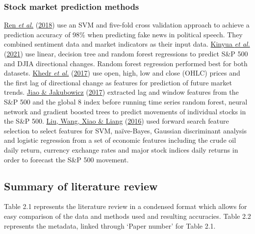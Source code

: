 \documentclass[11pt,preprint, authoryear]{elsarticle}
\numberwithin{equation}{section}
\numberwithin{figure}{section}
\numberwithin{table}{section}
\begin{document}
\hypertarget{stock-market-prediction-methods}{%
\subsubsection{\texorpdfstring{Stock market prediction methods
\label{stockPred}}{Stock market prediction methods }}\label{stock-market-prediction-methods}}

\protect\hyperlink{ref-ren2018forecasting}{Ren \emph{et al.}}
(\protect\hyperlink{ref-ren2018forecasting}{2018}) use an SVM and
five-fold cross validation approach to achieve a prediction accuracy of
98\% when predicting fake news in political speech. They combined
sentiment data and market indicators as their input data.
\protect\hyperlink{ref-kinyua2021analysis}{Kinyua \emph{et al.}}
(\protect\hyperlink{ref-kinyua2021analysis}{2021}) use linear, decision
tree and random forest regressions to predict S\&P 500 and DJIA
directional changes. Random forest regression performed best for both
datasets. \protect\hyperlink{ref-khedr2017predicting}{Khedr \emph{et
al.}} (\protect\hyperlink{ref-khedr2017predicting}{2017}) use open,
high, low and close (OHLC) prices and the first lag of directional
change as features for prediction of future market trends.
\protect\hyperlink{ref-jiao2017predicting}{Jiao \& Jakubowicz}
(\protect\hyperlink{ref-jiao2017predicting}{2017}) extracted lag and
window features from the S\&P 500 and the global 8 index before running
time series random forest, neural network and gradient boosted trees to
predict movements of individual stocks in the S\&P 500.
\protect\hyperlink{ref-liu2016forecasting}{Liu, Wang, Xiao \& Liang}
(\protect\hyperlink{ref-liu2016forecasting}{2016}) used forward search
feature selection to select features for SVM, naïve-Bayes, Gaussian
discriminant analysis and logistic regression from a set of economic
features including the crude oil daily return, currency exchange rates
and major stock indices daily returns in order to forecast the S\&P 500
movement.

\hypertarget{summary-of-literature-review}{%
\subsection{\texorpdfstring{Summary of literature review
\label{litSumm}}{Summary of literature review }}\label{summary-of-literature-review}}

Table 2.1 represents the literature review in a condensed format which
allows for easy comparison of the data and methods used and resulting
accuracies. Table 2.2 represents the metadata, linked through `Paper
number' for Table 2.1.
\end{document}
